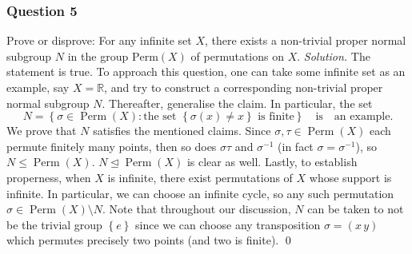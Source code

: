 \documentclass[12pt]{article}
\begin{document}
\subsubsection*{Question 5}
Prove or disprove: For any infinite set $X$, there exists a non-trivial proper normal subgroup $N$ in the group $\mathrm{Perm}(X)$ of permutations on $X$.
\newline
\newline\textit{Solution.} The statement is true. To approach this question, one can take some infinite set as an example, say $X=\mathbb{R}$, and try to construct a corresponding non-trivial proper normal subgroup $N$. Thereafter, generalise the claim. In particular, the set \[N=\left\{\sigma\in \operatorname{Perm}\left(X\right):\text{the set }\left\{\sigma\left(x\right)\ne x\right\}\text{ is finite}\right\}\quad\text{is}\quad\text{an example}.\]
We prove that $N$ satisfies the mentioned claims. Since $\sigma,\tau \in \operatorname{Perm}\left(X\right)$ each permute finitely many points, then so does $\sigma\tau$ and $\sigma^{-1}$ (in fact $\sigma=\sigma^{-1}$), so $N\le \operatorname{Perm}\left(X\right)$. $N\unlhd \operatorname{Perm}\left(X\right)$ is clear as well.
\newline
\newline Lastly, to establish properness, when $X$ is infinite, there exist permutations of $X$ whose support is infinite. In particular, we can choose an infinite cycle, so any such permutation $\sigma \in \operatorname{Perm}\left(X\right)\setminus N$. Note that throughout our discussion, $N$ can be taken to not be the trivial group $\left\{e\right\}$ since we can choose any transposition $\sigma=\left(x\, y\right)$ which permutes precisely two points (and two is finite). \qed 
\newpage
\end{document}
